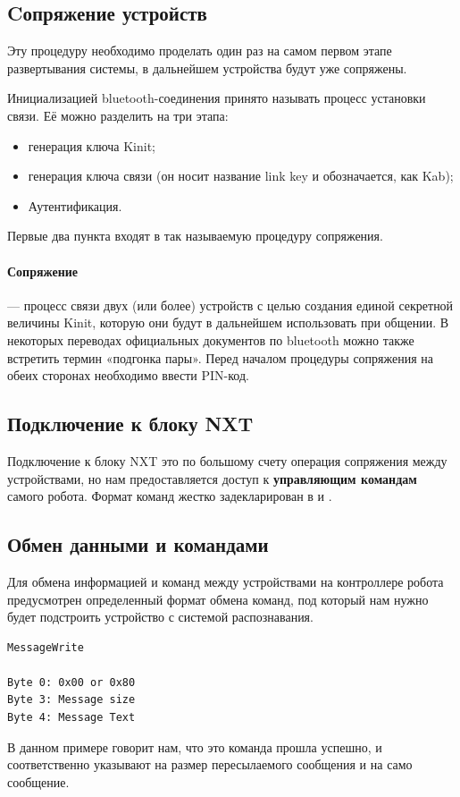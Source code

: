 \subsection{Cопряжение устройств}
Эту процедуру необходимо проделать один раз на самом первом этапе развертывания системы, в дальнейшем устройства будут уже сопряжены.

Инициализацией bluetooth-соединения принято называть процесс установки связи. Её можно разделить на три этапа:

\begin{itemize}
 \item генерация ключа Kinit;
 \item генерация ключа связи (он носит название link key и обозначается, как Kab);
 \item Аутентификация.
\end{itemize}

Первые два пункта входят в так называемую процедуру сопряжения.

\paragraph{Сопряжение}  — процесс связи двух (или более) устройств с целью создания единой секретной величины Kinit, которую они будут в дальнейшем использовать при общении. В некоторых переводах официальных документов по bluetooth можно также встретить термин «подгонка пары». Перед началом процедуры сопряжения на обеих сторонах необходимо ввести PIN-код.

\subsection{Подключение к блоку NXT}
Подключение к блоку NXT это по большому счету операция сопряжения между устройствами, но нам предоставляется доступ к \textbf{управляющим командам} самого робота.
Формат команд жестко задекларирован  в \cite{Pup09} и \cite{Pup10}. 

\subsection{Обмен данными и командами}

Для обмена информацией и команд между устройствами на контроллере робота предусмотрен определенный формат обмена команд, под который нам нужно будет подстроить устройство с системой распознавания.

\begin{lstlisting}[caption=Формат команд для получения потока данных]
MessageWrite

Byte 0: 0x00 or 0x80
Byte 3: Message size
Byte 4: Message Text
\end{lstlisting}
В данном примере  говорит нам, что это команда прошла успешно,  и  соответственно указывают на размер пересылаемого сообщения и на само сообщение.

